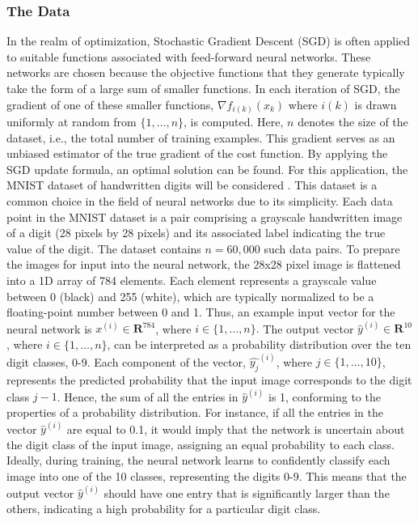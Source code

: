 \subsubsection{The Data}
In the realm of optimization, Stochastic Gradient Descent (SGD) is often applied to suitable functions associated with feed-forward neural networks. These networks are chosen because the objective functions that they generate typically take the form of a large sum of smaller functions. In each iteration of SGD, the gradient of one of these smaller functions, $\nabla f_{i(k)}(x_{k})$ where $i(k)$ is drawn uniformly at random from $\{1,\ldots,n\}$, is computed. Here, $n$ denotes the size of the dataset, i.e., the total number of training examples. This gradient serves as an unbiased estimator of the true gradient of the cost function. By applying the SGD update formula, an optimal solution can be found. For this application, the MNIST dataset of handwritten digits will be considered \cite{deng2012mnist}. This dataset is a common choice in the field of neural networks due to its simplicity. Each data point in the MNIST dataset is a pair comprising a grayscale handwritten image of a digit (28 pixels by 28 pixels) and its associated label indicating the true value of the digit. The dataset contains $n=60,000$ such data pairs. To prepare the images for input into the neural network, the 28x28 pixel image is flattened into a 1D array of 784 elements. Each element represents a grayscale value between 0 (black) and 255 (white), which are typically normalized to be a floating-point number between 0 and 1. Thus, an example input vector for the neural network is $x^{(i)} \in \mathbf{R}^{784}$, where $i \in \{1,\ldots,n\}.$ The output vector $\hat{y}^{(i)} \in \mathbf{R}^{10}$, where $i \in \{1,\ldots,n\}$, can be interpreted as a probability distribution over the ten digit classes, 0-9. Each component of the vector, $\hat{y_{j}}^{(i)}$, where $j \in \{1,\ldots,10\}$, represents the predicted probability that the input image corresponds to the digit class $j-1$. Hence, the sum of all the entries in $\hat{y}^{(i)}$ is 1, conforming to the properties of a probability distribution. For instance, if all the entries in the vector $\hat{y}^{(i)}$ are equal to 0.1, it would imply that the network is uncertain about the digit class of the input image, assigning an equal probability to each class. Ideally, during training, the neural network learns to confidently classify each image into one of the 10 classes, representing the digits 0-9. This means that the output vector $\hat{y}^{(i)}$ should have one entry that is significantly larger than the others, indicating a high probability for a particular digit class.

